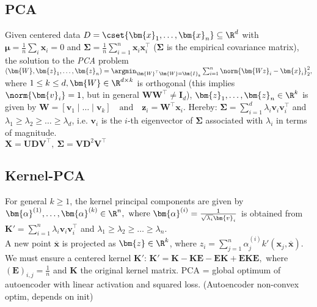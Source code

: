 \subsection{PCA}

Given centered data $D = \cset{\bm{x}_{1}, \dots, \bm{x}_{n}} \subseteq \R^{d}$ with $\bm{\mu} = \frac{1}{n}\sum_{i}\bm{x}_{i} = 0$ and
$\bm{\Sigma} = \frac{1}{n} \sum_{i=1}^{n}\bm{x}_{i}\bm{x}_{i}^{\top}$ ($\bm{\Sigma}$ is the empirical covariance matrix),
the solution to the \emph{PCA} problem
  $
    (\bm{W}, \bm{z}_{1}, \dots, \bm{z}_{n}) = \argmin_{\bm{W}^{\top}\bm{W} = \bm{I}_{k}} \sum_{i=1}^{n}\norm{\bm{Wz}_{i} - \bm{x}_{i}}_{2}^{2},
  $
  where $1 \leq k \leq d, \bm{W} \in \R^{d \times k}$ is orthogonal (this implies $\norm{\bm{v}_{i}} = 1$, but in general
$\bm{W}\bm{W}^{\top} \neq \bm{I}_{d}$), $\bm{z}_{1}, \dots, \bm{z}_{n} \in \R^{k}$ is given by
  $
    \bm{W} = [\bm{v}_{1} \; | \; \dots \; | \; \bm{v}_{k}] \quad\text{and}\quad \bm{z}_{i} = \bm{W}^{\top}\bm{x}_{i}.
  $
  Hereby: $\bm{\Sigma} = \sum_{i=1}^{d}\lambda_{i}\bm{v}_{i}\bm{v}_{i}^{\top}$ and $\lambda_{1} \geq \lambda_{2} \geq \dots \geq \lambda_{d}$, i.e. $\bm{v}_{i}$ is the
$i$-th eigenvector of $\bm{\Sigma}$ associated with $\lambda_{i}$ in terms of magnitude.\\
$\bm{X}=\bm{U}\bm{D}\bm{V}^{\top},\ \bm{\Sigma} = \bm{V}\bm{D}^{2}\bm{V}^{\top}$

%
\subsection{Kernel-PCA}
For general $k \geq 1$, the kernel principal components are given by
  $
    \bm{\alpha}^{(1)}, \dots, \bm{\alpha}^{(k)} \in \R^{n}, \text{ where } \bm{\alpha}^{(i)} = \frac{1}{\sqrt{\lambda_{i}}\bm{v}_{i}}
  $
  is obtained from $\bm{K'} = \sum_{i=1}^{n}\lambda_{i}\bm{v}_{i}\bm{v}_{i}^{\top}$ and $\lambda_{1} \geq \lambda_{2} \geq \dots \geq \lambda_{n}$. \\
  A new point $\bm{\overline{x}}$ is projected as $\bm{z} \in \R^{k}$, where
  $
    z_{i} = \sum_{j=1}^{n}\alpha_{j}^{(i)}k'(\bm{x}_{j}, \bm{\overline{x}}).
  $
  We must ensure a centered kernel $\bm{K'}$:
  $
    \bm{K'} = \bm{K} - \bm{KE} - \bm{EK} + \bm{EKE},
  $
  where $(\bm{E})_{i,j} = \frac{1}{n}$ and $\bm{K}$ the original kernel matrix.
PCA = global optimum of autoencoder with linear activation and squared loss. (Autoencoder non-convex optim, depends on init)

